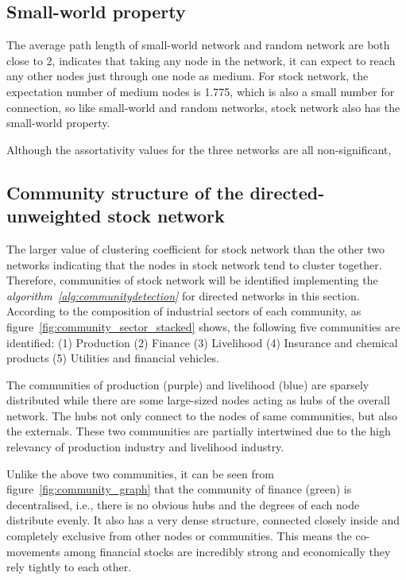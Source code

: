 \subsection{Small-world property}
The average path length of small-world network and random network are both close to 2, indicates that taking any node in the network, it can expect to reach any other nodes just through one node as medium. For stock network, the expectation number of medium nodes is 1.775, which is also a small number for connection, so like small-world and random networks, stock network also has the small-world property.


Although the assortativity values for the three networks are all non-significant, 

\subsection{Community structure of the directed-unweighted stock network}
The larger value of clustering coefficient for stock network than the other two networks indicating that the nodes in stock network tend to cluster together. Therefore, communities of stock network will be identified implementing the \textit{algorithm~\ref{alg:communitydetection}} for directed networks in this section. According to the composition of industrial sectors of each community, as figure~\ref{fig:community_sector_stacked} shows, the following five communities are identified: (1) Production (2) Finance (3) Livelihood (4) Insurance and chemical products (5) Utilities and financial vehicles.

The communities of production (purple) and livelihood (blue) are sparsely distributed while there are some large-sized nodes acting as hubs of the overall network. The hubs not only connect to the nodes of same communities, but also the externals. These two communities are partially intertwined due to the high relevancy of production industry and livelihood industry. 

Unlike the above two communities, it can be seen from figure~\ref{fig:community_graph} that the community of finance (green) is decentralised, i.e., there is no obvious hubs and the degrees of each node distribute evenly. It also has a very dense structure, connected closely inside and completely exclusive from other nodes or communities. This means the co-movements among financial stocks are incredibly strong and economically they rely tightly to each other.

